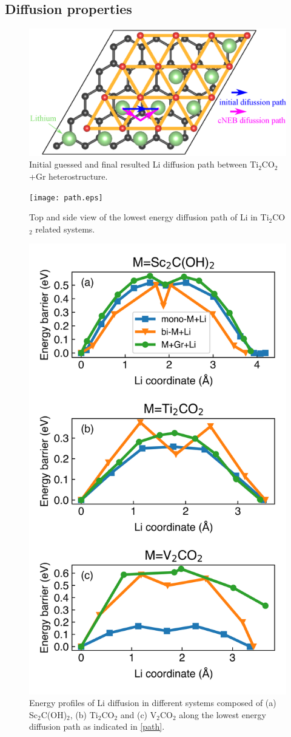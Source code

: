 \subsection{Diffusion properties}

\begin{figure}[htbp]
\centering
\includegraphics[width=0.7\linewidth]{sites_path.eps}%
\caption{Initial guessed and final resulted Li diffusion path between Ti$_2$CO$_2$+Gr heterostructure. }
\end{figure}

\begin{figure}[htbp]
\centering
\texttt{[image: path.eps]}%
\caption{Top and side view of  the lowest energy diffusion path of Li in Ti$_2$CO$_2$ related systems. \label{path}}
\end{figure}

\begin{figure}[htbp]
\centering
\includegraphics[width=0.6\linewidth]{Li_barrier.png}%
\caption{Energy profiles of  Li diffusion in different systems composed of (a) Sc$_2$C(OH)$_2$, (b) Ti$_2$CO$_2$ and (c) V$_2$CO$_2$ along the lowest energy diffusion path as indicated in \autoref{path}. \label{barrier}}
\end{figure}

